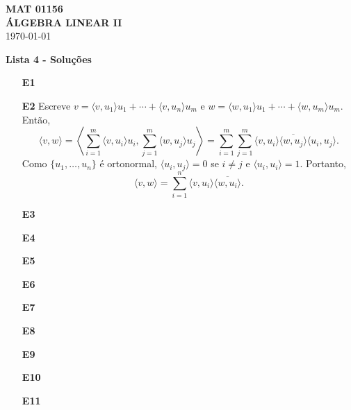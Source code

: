 \documentclass{article}
\begin{document}
\begin{center}
    \large \textbf{MAT 01156 \\
    ÁLGEBRA LINEAR II \\}
    \vspace{0.4cm}
    \today
\end{center}

\begin{center}
    \large \textbf{Lista 4 - Soluções}
\end{center}

\begin{enumerate}
    \item [\textbf{E1}]
    \item [\textbf{E2}] Escreve \(v = \langle v, u_1 \rangle u_1 + \cdots + \langle v, u_n \rangle u_m\) e \(w = \langle w, u_1 \rangle u_1 + \cdots + \langle w, u_m \rangle u_m\). Então,
    \[
        \langle v, w \rangle = \left\langle \sum_{i=1}^m \langle v, u_i \rangle u_i, \sum_{j=1}^m \langle w, u_j \rangle u_j \right\rangle = \sum_{i=1}^m \sum_{j=1}^m \langle v, u_i \rangle \overline{\langle w, u_j \rangle} \langle u_i, u_j \rangle.
    \] Como \(\{u_1, \ldots, u_n\}\) é ortonormal, \(\langle u_i, u_j \rangle = 0\) se \(i \neq j\) e \(\langle u_i, u_i \rangle = 1\). Portanto,
    \[
        \langle v, w \rangle = \sum_{i=1}^n \langle v, u_i \rangle \overline{\langle w, u_i \rangle}.
    \]
    \item [\textbf{E3}]
    \item [\textbf{E4}]
    \item [\textbf{E5}]
    \item [\textbf{E6}]
    \item [\textbf{E7}]
    \item [\textbf{E8}]
    \item [\textbf{E9}]
    \item [\textbf{E10}]
    \item [\textbf{E11}]
\end{enumerate}
\end{document}
